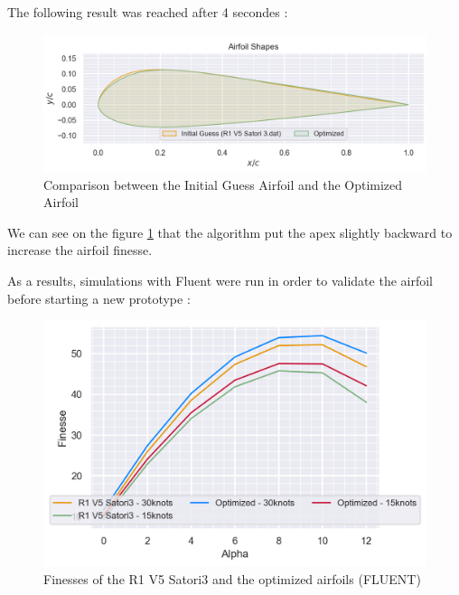 The following result was reached after 4 secondes :
\begin{figure}[H]
    \centering
    \includegraphics[width=1.\textwidth]{figures/Optimization/2D/Comparison intial guess and optimized airfoils.png}
    \caption{Comparison between the Initial Guess Airfoil and the Optimized Airfoil}
    \label{fig:Comparison between the Initial Guess Airfoil and the Optimized Airfoil}
\end{figure}

We can see on the figure \ref{fig:Comparison between the Initial Guess Airfoil and the Optimized Airfoil} that the algorithm put the apex slightly backward to increase the airfoil finesse.

As a results, simulations with Fluent were run in order to validate the airfoil before starting a new prototype : 

\begin{figure}[H]
    \centering
    \includegraphics[width=1.\textwidth]{figures/Optimization/2D/finesse optimized and Satori3.png}
    \caption{Finesses of the R1 V5 Satori3 and the optimized airfoils (FLUENT)}
    \label{fig:Finesses of the R1 V5 Satori3 and the optimized airfoils}
\end{figure}

